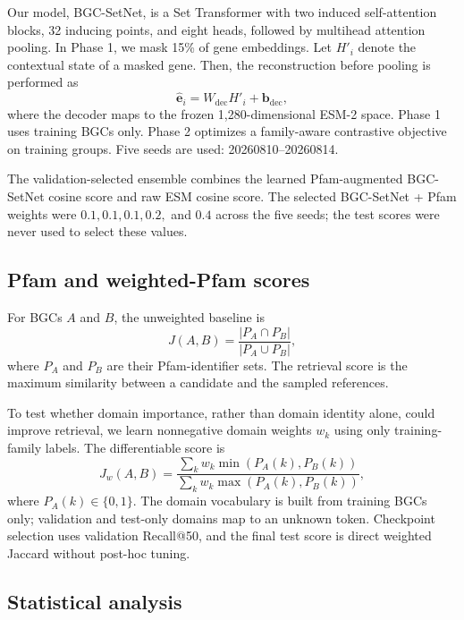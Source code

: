 \documentclass{article}
\begin{document}
Our model, BGC-SetNet, is a Set Transformer with two induced self-attention blocks, 32 inducing points, and eight heads, followed by multihead attention pooling. In Phase 1, we mask 15\% of gene embeddings. Let $H'_i$ denote the contextual state of a masked gene. Then, the reconstruction before pooling is performed as
\begin{equation}
    \widehat{\mathbf e}_i=W_{\mathrm{dec}}H'_i+\mathbf b_{\mathrm{dec}},
\end{equation}
where the decoder maps to the frozen 1,280-dimensional ESM-2 space. Phase 1 uses training BGCs only. Phase 2 optimizes a family-aware contrastive objective on training groups. Five seeds are used: 20260810--20260814.

The validation-selected ensemble combines the learned Pfam-augmented BGC-SetNet cosine score and raw ESM cosine score. The selected BGC-SetNet + Pfam weights were $0.1, 0.1, 0.1, 0.2,$ and $0.4$ across the five seeds; the test scores were never used to select these values.

\subsection{Pfam and weighted-Pfam scores}

For BGCs $A$ and $B$, the unweighted baseline is
\begin{equation}
J(A,B)=\frac{|P_A\cap P_B|}{|P_A\cup P_B|},
\end{equation}
where $P_A$ and $P_B$ are their Pfam-identifier sets. The retrieval score is the maximum similarity between a candidate and the sampled references.

To test whether domain importance, rather than domain identity alone, could improve retrieval, we learn nonnegative domain weights $w_k$ using only training-family labels. The differentiable score is
\begin{equation}
J_w(A,B)=\frac{\sum_k w_k\min(P_A(k),P_B(k))}{\sum_k w_k\max(P_A(k),P_B(k))},
\end{equation}
where $P_A(k)\in\{0,1\}$. The domain vocabulary is built from training BGCs only; validation and test-only domains map to an unknown token. Checkpoint selection uses validation Recall@50, and the final test score is direct weighted Jaccard without post-hoc tuning.

\subsection{Statistical analysis}
\end{document}
